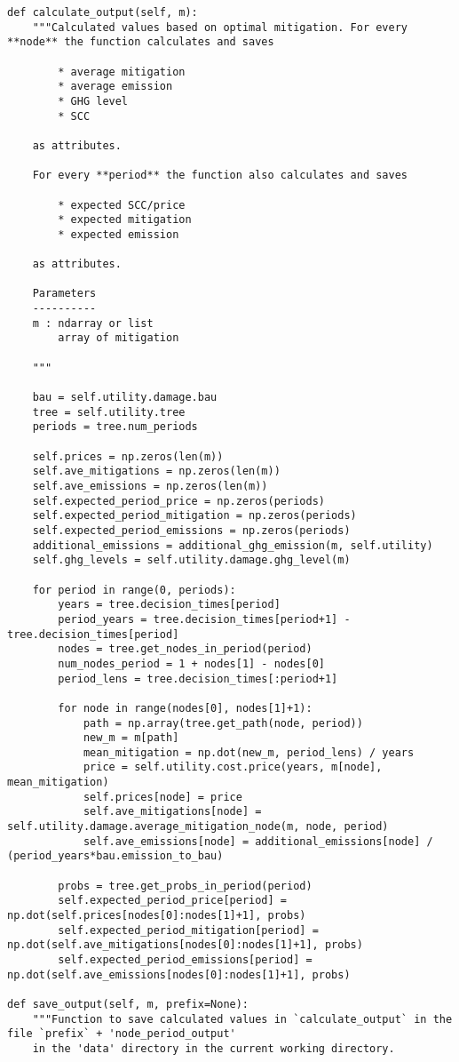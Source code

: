 \documentclass[12pt]{article}
\begin{document}
\begin{verbatim}
def calculate_output(self, m):
	"""Calculated values based on optimal mitigation. For every **node** the function calculates and saves
		
		* average mitigation
		* average emission
		* GHG level
		* SCC

	as attributes.

	For every **period** the function also calculates and saves
		
		* expected SCC/price
		* expected mitigation
		* expected emission
	
	as attributes.

	Parameters
	----------
	m : ndarray or list
		array of mitigation

	"""

	bau = self.utility.damage.bau
	tree = self.utility.tree
	periods = tree.num_periods

	self.prices = np.zeros(len(m))
	self.ave_mitigations = np.zeros(len(m))
	self.ave_emissions = np.zeros(len(m))
	self.expected_period_price = np.zeros(periods)
	self.expected_period_mitigation = np.zeros(periods)
	self.expected_period_emissions = np.zeros(periods)
	additional_emissions = additional_ghg_emission(m, self.utility)
	self.ghg_levels = self.utility.damage.ghg_level(m)

	for period in range(0, periods):
		years = tree.decision_times[period]
		period_years = tree.decision_times[period+1] - tree.decision_times[period]
		nodes = tree.get_nodes_in_period(period)
		num_nodes_period = 1 + nodes[1] - nodes[0]
		period_lens = tree.decision_times[:period+1]
		
		for node in range(nodes[0], nodes[1]+1):
			path = np.array(tree.get_path(node, period))
			new_m = m[path]
			mean_mitigation = np.dot(new_m, period_lens) / years
			price = self.utility.cost.price(years, m[node], mean_mitigation)
			self.prices[node] = price
			self.ave_mitigations[node] = self.utility.damage.average_mitigation_node(m, node, period)
			self.ave_emissions[node] = additional_emissions[node] / (period_years*bau.emission_to_bau)
		
		probs = tree.get_probs_in_period(period)
		self.expected_period_price[period] = np.dot(self.prices[nodes[0]:nodes[1]+1], probs)
		self.expected_period_mitigation[period] = np.dot(self.ave_mitigations[nodes[0]:nodes[1]+1], probs)
		self.expected_period_emissions[period] = np.dot(self.ave_emissions[nodes[0]:nodes[1]+1], probs)

def save_output(self, m, prefix=None):
	"""Function to save calculated values in `calculate_output` in the file `prefix` + 'node_period_output'
	in the 'data' directory in the current working directory.


\end{verbatim}
\end{document}
